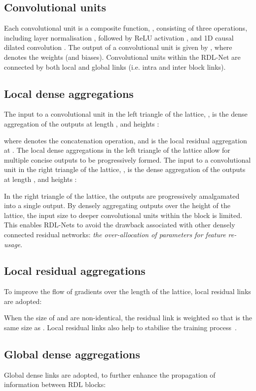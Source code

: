 \documentclass[letterpaper]{article} \usepackage{aaai20}  \usepackage{times}  \usepackage{helvet} \usepackage{courier}  \usepackage[hyphens]{url}  \usepackage{graphicx} \urlstyle{rm} \def\UrlFont{\rm}  \usepackage{graphicx}  \frenchspacing  \setlength{\pdfpagewidth}{8.5in}  \setlength{\pdfpageheight}{11in}
\begin{document}
\subsection{Convolutional units}
Each convolutional unit is a composite function, , consisting of three operations, including layer normalisation \cite{ba2016layer}, followed by ReLU activation \cite{glorot_deep_2011}, and 1D causal dilated convolution \cite{bai2018empirical}. The output of a convolutional unit is given by , where  denotes the weights (and biases). Convolutional units within the RDL-Net are connected by both local and global links (i.e. intra and inter block links).

\subsection{Local dense aggregations}
The input to a convolutional unit in the left triangle of the lattice, , is the dense aggregation of the outputs at length , and heights :

where  denotes the concatenation operation, and  is the local residual aggregation at . The local dense aggregations in the left triangle of the lattice allow for multiple concise outputs to be progressively formed. The input to a convolutional unit in the right triangle of the lattice, , is the dense aggregation of the outputs at length , and heights :

In the right triangle of the lattice, the outputs are progressively amalgamated into a single output. By densely aggregating outputs over the height of the lattice, the input size to deeper convolutional units within the block is limited. This enables RDL-Nets to avoid the drawback associated with other densely connected residual networks: \textit{the over-allocation of parameters for feature re-usage}.

\subsection{Local residual aggregations}
To improve the flow of gradients over the length of the lattice, local residual links are adopted:

When the size of  and  are non-identical, the residual link is weighted so that  is the same size as . Local residual links also help to stabilise the training process~\cite{he2016identity}.

\subsection{Global dense aggregations}
Global dense links are adopted, to further enhance the propagation of information between RDL blocks:
\end{document}
